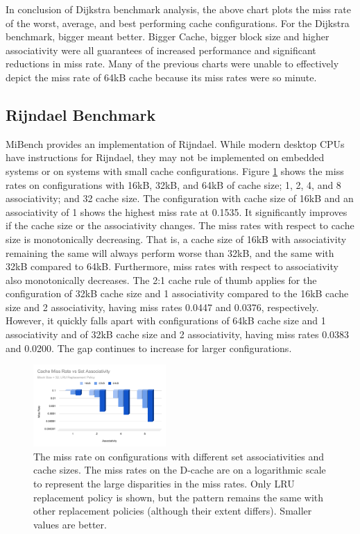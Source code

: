 \documentclass[conference]{IEEEtran}
\begin{document}
In conclusion of Dijkstra benchmark analysis, the above chart plots the miss rate of the worst, average, and best performing cache configurations. For the Dijkstra benchmark, bigger meant better. Bigger Cache, bigger block size and higher associativity were all guarantees of increased performance and significant reductions in miss rate. Many of the previous charts were unable to effectively depict the miss rate of 64kB cache because its miss rates were so minute.

\subsection{Rijndael Benchmark}

MiBench provides an implementation of Rijndael. While modern desktop CPUs have instructions for Rijndael\cite{gueron2010intel}, they may not be implemented on embedded systems or on systems with small cache configurations. Figure \ref{fig:rijndael-missrate-assoc-32} shows the miss rates on configurations with 16kB, 32kB, and 64kB of cache size; 1, 2, 4, and 8 associativity; and 32 cache size. The configuration with cache size of 16kB and an associativity of 1 shows the highest miss rate at 0.1535. It significantly improves if the cache size or the associativity changes. The miss rates with respect to cache size is monotonically decreasing. That is, a cache size of 16kB with associativity remaining the same will always perform worse than 32kB, and the same with 32kB compared to 64kB. Furthermore, miss rates with respect to associativity also monotonically decreases. The 2:1 cache rule of thumb applies for the configuration of 32kB cache size and 1 associativity compared to the 16kB cache size and 2 associativity, having miss rates 0.0447 and 0.0376, respectively. However, it quickly falls apart with configurations of 64kB cache size and 1 associativity and of 32kB cache size and 2 associativity, having miss rates 0.0383 and 0.0200. The gap continues to increase for larger configurations.

\begin{figure}[H]
    \centering
    \includegraphics[width=0.45\textwidth]{images/missrate_assoc_32}
    \caption{The miss rate on configurations with different set associativities and cache sizes. The miss rates on the D-cache are on a logarithmic scale to represent the large disparities in the miss rates. Only LRU replacement policy is shown, but the pattern remains the same with other replacement policies (although their extent differs). Smaller values are better.}
    \label{fig:rijndael-missrate-assoc-32}
\end{figure}
\end{document}
